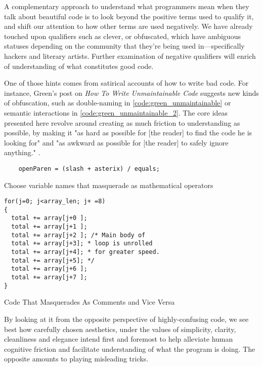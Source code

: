 \vspace{1\baselineskip}

A complementary approach to understand what programmers mean when they talk about beautiful code is to look beyond the positive terms used to qualify it, and shift our attention to how other terms are used negatively. We have already touched upon qualifiers such as clever, or obfuscated, which have ambiguous statuses depending on the community that they're being used in—specifically hackers and literary artists. Further examination of negative qualifiers will enrich of understanding of what constitutes good code.

One of those hints comes from satirical accounts of how to write bad code. For instance, Green's post on \emph{ How To Write Unmaintainable Code} suggests new kinds of obfuscation, such as double-naming in \ref{code:green_unmaintainable} or semantic interactions in \ref{code:green_unmaintainable_2}. The core ideas presented here revolve around creating as much friction to understanding as possible, by making it "as hard as possible for [the reader] to find the code he is looking for" and "as awkward as possible for [the reader] to safely ignore anything." \citep{green_how_2006}.

\begin{listing}
  \begin{verbatim}
    openParen = (slash + asterix) / equals; 
  \end{verbatim}
  \caption{Choose variable names that masquerade as mathematical operators}
  \label{code:green_unmaintainable}
\end{listing}

\begin{listing}
  \begin{verbatim}
for(j=0; j<array_len; j+ =8)
{
  total += array[j+0 ];
  total += array[j+1 ];
  total += array[j+2 ]; /* Main body of
  total += array[j+3]; * loop is unrolled
  total += array[j+4]; * for greater speed.
  total += array[j+5]; */
  total += array[j+6 ];
  total += array[j+7 ];
} 
\end{verbatim}
  \caption{Code That Masquerades As Comments and Vice Versa}
  \label{code:green_unmaintainable_2}
\end{listing}

By looking at it from the opposite perspective of highly-confusing code, we see best how carefully chosen aesthetics, under the values of simplicity, clarity, cleanliness and elegance intend first and foremost to help alleviate human cognitive friction and facilitate understanding of what the program is doing. The opposite amounts to playing misleading tricks.

